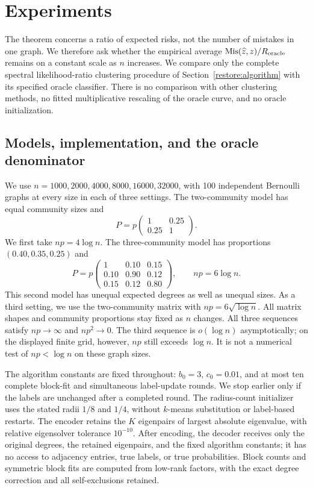 \section{Experiments}\label{sec:experiments}

The theorem concerns a ratio of expected risks, not the number of mistakes
in one graph. We therefore ask whether the empirical average
$\operatorname{Mis}(\widehat z,z)/R_{\mathrm{oracle}}$ remains on a constant scale as
$n$ increases. We compare only the complete spectral likelihood-ratio
clustering procedure of Section~\ref{restore:algorithm} with its
specified oracle classifier. There is
no comparison with other clustering methods, no fitted multiplicative
rescaling of the oracle curve, and no oracle initialization.

\subsection{Models, implementation, and the oracle denominator}

We use $n=1000,2000,4000,8000,16000,32000$, with 100 independent
Bernoulli graphs at every size in each of three settings. The two-community
model has equal community sizes and
\[
 P=p\begin{pmatrix}1&0.25\\0.25&1\end{pmatrix}.
\]
We first take $np=4\log n$. The three-community model has proportions
$(0.40,0.35,0.25)$ and
\[
 P=p\begin{pmatrix}
 1&0.10&0.15\\
 0.10&0.90&0.12\\
 0.15&0.12&0.80
 \end{pmatrix},\qquad np=6\log n.
\]
This second model has unequal expected degrees as well as unequal sizes.
As a third setting, we use the two-community matrix with
$np=6\sqrt{\log n}$. All matrix shapes and community proportions stay
fixed as $n$ changes. All three sequences satisfy $np\to\infty$ and
$np^2\to0$. The third sequence is $o(\log n)$ asymptotically;
on the displayed finite grid, however, $np$ still exceeds $\log n$.
It is not a numerical test of $np<\log n$ on these graph sizes.

The algorithm constants are fixed throughout: $b_0=3$, $c_0=0.01$,
and at most ten complete block-fit and simultaneous label-update rounds.
We stop earlier only if the labels are unchanged after a completed round.
The radius-count initializer uses the stated radii $1/8$ and $1/4$,
without $k$-means substitution or label-based restarts. The encoder retains
the $K$ eigenpairs of largest absolute eigenvalue, with relative eigensolver
tolerance $10^{-10}$. After encoding, the decoder receives only the original
degrees, the retained eigenpairs, and the fixed algorithm constants;
it has no access to adjacency entries, true labels, or true probabilities.
Block counts and symmetric block fits are computed from low-rank factors,
with the exact degree correction and all self-exclusions retained.

